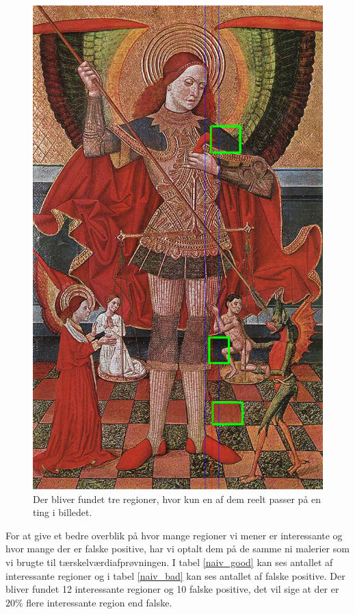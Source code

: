 \begin{figure}[h!!]
	\begin{center}
		\includegraphics[scale=0.3,angle=0]{afsnit/afprovning/billeder/naive_losning/naiv_virker_ikke3.png}
	\end{center}
	\caption[]{Der bliver fundet tre regioner, hvor kun en af dem reelt passer
	på en ting i billedet.}
	\label{naiv_virker_ikke3}
\end{figure}
\clearpage

For at give et bedre overblik på hvor mange regioner vi mener er
interessante og hvor mange der er falske positive, har vi optalt dem på
de samme ni malerier som vi brugte til tærskelværdiafprøvningen. I tabel
\ref{naiv_good} kan ses antallet af interessante regioner og i tabel
\ref{naiv_bad} kan ses antallet af falske positive. Der bliver fundet 12
interessante regioner og 10 falske positive, det vil sige at der er $20
\%$ flere interessante region end falske.

